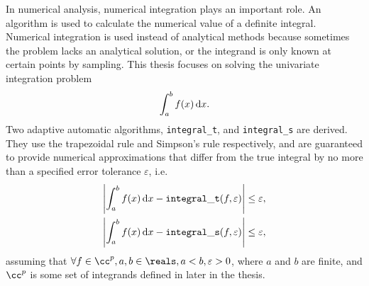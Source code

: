 \documentclass{iitthesis}
\theoremstyle{definition}
\theoremstyle{remark}
\begin{document}
\begin{abstract}           %
\end{abstract}


\textpages     %


In numerical analysis, numerical integration plays an important role. An algorithm is used to calculate the numerical value of a definite integral. Numerical integration is used instead of analytical methods because sometimes the problem lacks an analytical solution, or the integrand is only known at certain points by sampling. This thesis focuses on solving the univariate integration problem
\begin{equation}\label{integral}
    \int_{a}^{b}f(x)\,\textup{d}x.
\end{equation}
Two adaptive automatic algorithms, {\tt integral\_t}, and {\tt integral\_s} are derived. They use the trapezoidal rule and Simpson's rule respectively, and are guaranteed to provide numerical approximations that differ from the true integral by no more than a specified error tolerance $\varepsilon$, i.e.
\begin{align}\label{approx}
      \left|\int_{a}^{b}f(x)\,\textup{d}x-{\tt integral\_t}(f,\varepsilon)\right|\leq \varepsilon,& \\
      \left|\int_{a}^{b}f(x)\,\textup{d}x-{\tt integral\_s}(f,\varepsilon)\right|\leq \varepsilon,&
\end{align}
assuming that $\forall f \in \cc^{p}, a,b\in\reals, a<b, \varepsilon>0$, where $a$ and $b$ are finite, and $\cc^{p}$ is some set of integrands defined in later in the thesis.
\end{document}
